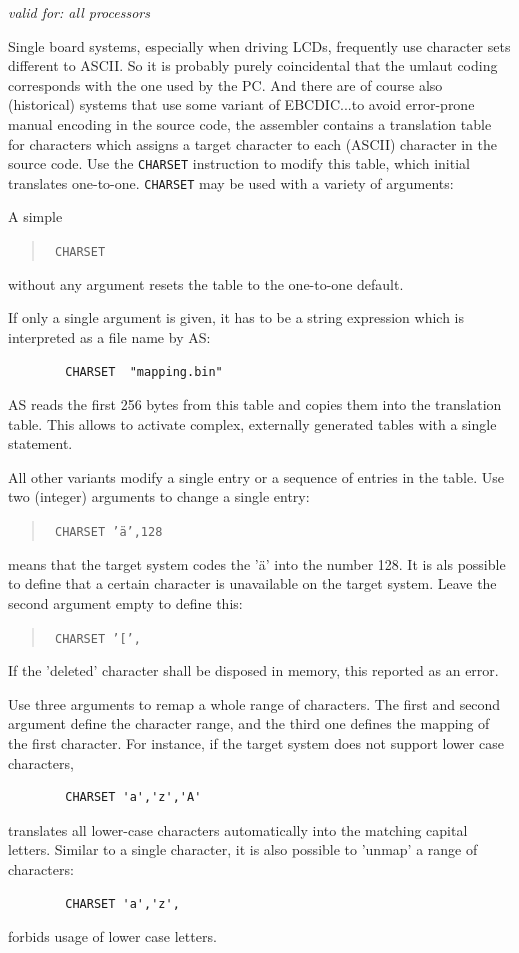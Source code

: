 \documentclass[12pt,twoside]{report}
\newcommand{\tty}[1]{{\tt #1}}
\newcommand{\asname}{{AS}}
\begin{document}
{\em valid for: all processors}

Single board systems, especially when driving LCDs, frequently use
character sets different to ASCII.  So it is probably purely coincidental
that the umlaut coding corresponds with the one used by the PC.  And there
are of course also (historical) systems that use some variant of EBCDIC...to avoid
error-prone manual encoding in the source code, the assembler contains a translation table
for characters which assigns a target character to each (ASCII) character
in the source code.  Use the \tty{CHARSET} instruction to modify this
table, which initial translates one-to-one.  \tty{CHARSET} may be used with
a variety of arguments:

A simple
\begin{quote}{\tt
        CHARSET
}\end{quote}
without any argument resets the table to the one-to-one default.

If only a single argument is given, it has to be a string expression which is
interpreted as a file name by \asname{}:
\begin{verbatim}
        CHARSET  "mapping.bin"
\end{verbatim}
\asname{} reads the first 256 bytes from this table and copies them into the translation
table.  This allows to activate complex, externally generated tables with a single
statement.

All other variants modify a single entry or a sequence of entries in the
table.  Use two (integer) arguments to change a single entry:
\begin{quote}{\tt
       CHARSET  '\"a',128
}\end{quote}
means that the target system codes the '\"a'  into the number 128.  It is
als possible to define that a certain character is unavailable on the target
system.  Leave the second argument empty to define this:
\begin{quote}{\tt
        CHARSET '[',
}\end{quote}
If the 'deleted' character shall be disposed in memory, this reported as
an error.

Use three arguments to remap a whole range of characters.  The first and
second argument define the character range, and the third one defines
the mapping of the first character.  For instance, if the target system
does not support lower case characters,
\begin{verbatim}
        CHARSET 'a','z','A'
\end{verbatim}
translates all lower-case characters automatically into the matching
capital letters.  Similar to a single character, it is also possible to
'unmap' a range of characters:
\begin{verbatim}
        CHARSET 'a','z',
\end{verbatim}
forbids usage of lower case letters.
\end{document}
